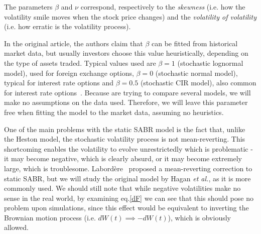 The parameters $\beta$ and $\nu$ correspond, respectively to the \emph{skewness} (i.e. how the volatility smile moves when the stock price changes) and the \emph{volatility of volatility} (i.e. how erratic is the volatility process).



In the original article, the authors claim that $\beta$ can be fitted from historical market data, but usually investors choose this value heuristically, depending on the type of assets traded. Typical values used are $\beta=1$ (stochastic lognormal model), used for foreign exchange options, $\beta=0$ (stochastic normal model), typical for interest rate options and $\beta=0.5$ (stochastic CIR model), also common for interest rate options~\citep{Hagan}.
Because are trying to compare several models, we will make no assumptions on the data used. Therefore, we will leave this parameter free when fitting the model to the market data, assuming no heuristics.

One of the main problems with the static SABR model is the fact that, unlike the Heston model, the stochastic volatility process is not mean-reverting. This shortcoming enables the volatility to evolve unrestrictedly which is problematic - it may become negative, which is clearly absurd, or it may become extremely large, which is troublesome. Labordère~\citep{Labordere} proposed a mean-reverting correction to static SABR, but we will study the original model by Hagan \textit{et al.}, as it is more commonly used. We should still note that while negative volatilities make no sense in the real world, by examining eq.\eqref{dF} we can see that this should pose no problem upon simulations, since this effect would be equivalent to inverting the Brownian motion process (i.e. $dW(t)\implies-dW(t)$), which is obviously allowed.

